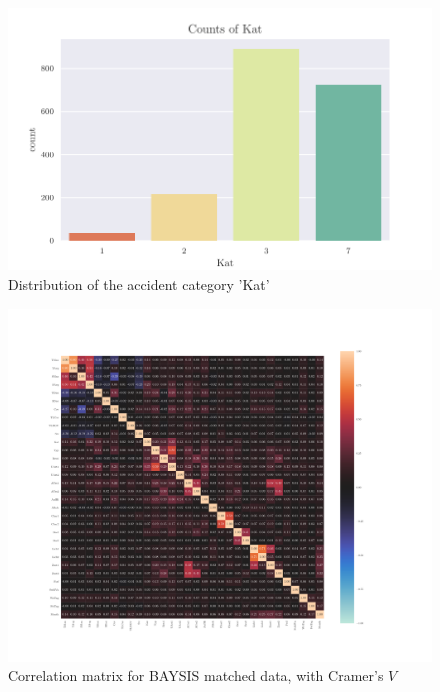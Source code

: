 \documentclass[a4paper,headsepline,footsepline,fontsize=11pt,BCOR=12mm,DIV=12]{report}
\begin{document}
\begin{appendices}
\begin{figure}[h]
	\centering
	\includegraphics[scale=1]{../CorrAnalysis/data/BAYSIS/02_matched/plots/baysis_matched_count_Kat}
	\caption{Distribution of the accident category 'Kat'}
	\label{img:appendix_baysis_matched_Kat}
\end{figure}

\begin{figure}[h]
	\centering
	\includegraphics[scale=0.52, trim=2cm 2cm 0cm 0cm]{../CorrAnalysis/data/BAYSIS/02_matched/plots/baysis_matched_corr_cramers}
	\caption{Correlation matrix for BAYSIS matched data, with Cramer's $V$}
	\label{img:appendix_correlation_matrix_matched_cramers}
\end{figure}


\end{appendices}
\end{document}
